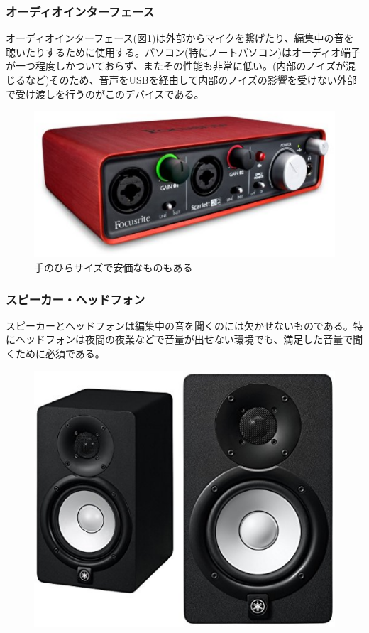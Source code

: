 \documentclass[ams]{U-AizuGT}
\begin{document}
\subsubsection{オーディオインターフェース}
オーディオインターフェース(図\ref{fig:audioI})は外部からマイクを繋げたり、編集中の音を聴いたりするために使用する。パソコン(特にノートパソコン)はオーディオ端子が一つ程度しかついておらず、またその性能も非常に低い。(内部のノイズが混じるなど)そのため、音声をUSBを経由して内部のノイズの影響を受けない外部で受け渡しを行うのがこのデバイスである。\\
\begin{figure}[htbp]
  \begin{center}
    \includegraphics[scale=0.3]{./audioI.eps}
    \caption{手のひらサイズで安価なものもある}
    \label{fig:audioI}
  \end{center}
\end{figure}
\subsubsection{スピーカー・ヘッドフォン}
スピーカーとヘッドフォンは編集中の音を聞くのには欠かせないものである。特にヘッドフォンは夜間の夜業などで音量が出せない環境でも、満足した音量で聞くために必須である。\\
\begin{figure}[htbp]
  \begin{center}
    \includegraphics[scale=0.2]{./speaker.eps}
    \label{fig:speaker}
  \end{center}
\end{figure}
\end{document}
